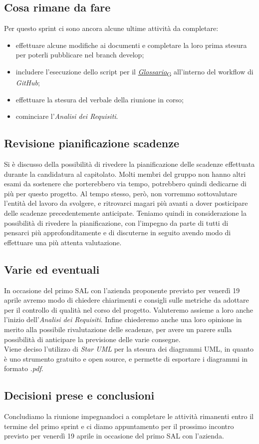 \documentclass[italian,12pt]{article}
\begin{document}
\subsection{Cosa rimane da fare}
Per questo sprint ci sono ancora alcune ultime attività da completare:
\begin{itemize}
	\item effettuare alcune modifiche ai documenti e completare la loro prima stesura per poterli pubblicare nel branch develop;
	\item includere l'esecuzione dello script per il \href{https://7last.github.io/docs/rtb/documentazione-interna/glossario#glossario}{\textit{Glossario}\textsubscript{G}} all'interno del workflow di \textit{GitHub};
	\item effettuare la stesura del verbale della riunione in corso;
	\item cominciare l'\textit{Analisi dei Requisiti}.
\end{itemize}

\subsection{Revisione pianificazione scadenze}
Si è discusso della possibilità di rivedere la pianificazione delle scadenze effettuata durante la candidatura al capitolato. Molti membri del gruppo non hanno altri esami da sostenere che porterebbero via tempo, potrebbero quindi dedicarne di più per questo progetto. Al tempo stesso, però, non vorremmo sottovalutare l'entità del lavoro da svolgere, e ritrovarci magari più avanti a dover posticipare delle scadenze precedentemente anticipate. Teniamo quindi in considerazione la possibilità di rivedere la pianificazione, con l'impegno da parte di tutti di pensarci più approfonditamente e di discuterne in seguito avendo modo di effettuare una più attenta valutazione.

\subsection{Varie ed eventuali}
In occasione del primo SAL con l'azienda proponente previsto per venerdì 19 aprile avremo modo di chiedere chiarimenti e consigli sulle metriche da adottare per il controllo di qualità nel corso del progetto. Valuteremo assieme a loro anche l'inizio dell'\textit{Analisi dei Requisiti}. Infine chiederemo anche una loro opinione in merito alla possibile rivalutazione delle scadenze, per avere un parere sulla possibilità di anticipare la previsione delle varie consegne. \\
Viene deciso l'utilizzo di \textit{Star UML} per la stesura dei diagrammi UML, in quanto è uno strumento gratuito e open source, e permette di esportare i diagrammi in formato \textit{.pdf}.

\subsection{Decisioni prese e conclusioni}
Concludiamo la riunione impegnandoci a completare le attività rimanenti entro il termine del primo sprint e ci diamo appuntamento per il prossimo incontro previsto per venerdì 19 aprile in occasione del primo SAL con l'azienda.
\end{document}
